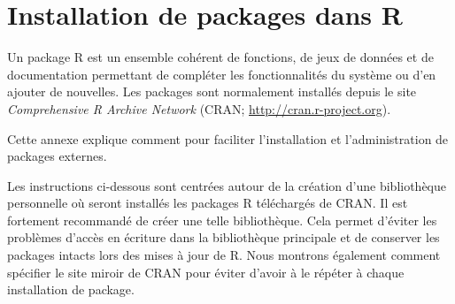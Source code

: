 \chapter{Installation de packages dans R}
\label{packages}

Un package R est un ensemble cohérent de fonctions, de jeux de données
et de documentation permettant de compléter les fonctionnalités du
système ou d'en ajouter de nouvelles. Les packages sont normalement
installés depuis le site \emph{Comprehensive R Archive Network} (CRAN;
\url{http://cran.r-project.org}).

Cette annexe explique comment  pour faciliter
l'installation et l'administration de packages externes.

Les instructions ci-dessous sont centrées autour de la création d'une
bibliothèque personnelle où seront installés les packages R
téléchargés de CRAN. Il est fortement recommandé de créer une telle
bibliothèque. Cela permet d'éviter les problèmes d'accès en écriture
dans la bibliothèque principale et de conserver les packages intacts
lors des mises à jour de R. Nous montrons également comment spécifier
le site miroir de CRAN pour éviter d'avoir à le répéter à chaque
installation de package.
